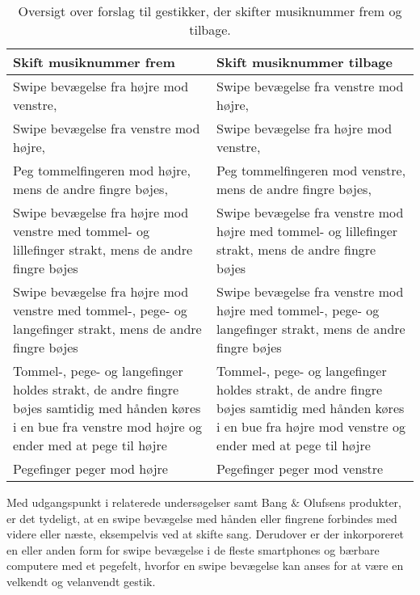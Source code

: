 \begin{table}[H]
	\centering
	\begin{tabular}{| p{6cm} | p{6cm} |}
		\hline
		\textbf{Skift musiknummer frem} & \textbf{Skift musiknummer tilbage} \\ \hline
		Swipe bevægelse fra højre mod venstre, \parencite[s. 48]{WEB:Beosound2, WEB:BeosoundMoment, PDF:UserDefinedGesturesTV} & Swipe bevægelse fra venstre mod højre, \parencite[s. 48]{WEB:Beosound2, WEB:BeosoundMoment, PDF:UserDefinedGesturesTV} \\ \hline
		Swipe bevægelse fra venstre mod højre, \parencite[s. 166]{PDF:ComparingInputModalities}  & Swipe bevægelse fra højre mod venstre, \parencite[s. 166]{PDF:ComparingInputModalities}  \\ \hline
		Peg tommelfingeren mod højre, mens de andre fingre bøjes, \parencite[s. 166]{PDF:ComparingInputModalities} & Peg tommelfingeren mod venstre, mens de andre fingre bøjes, \parencite[s. 166]{PDF:ComparingInputModalities} \\ \hline
		Swipe bevægelse fra højre mod venstre med tommel- og lillefinger strakt, mens de andre fingre bøjes & Swipe bevægelse fra venstre mod højre med tommel- og lillefinger strakt, mens de andre fingre bøjes \\ \hline
		Swipe bevægelse fra højre mod venstre med tommel-, pege- og langefinger strakt, mens de andre fingre bøjes & Swipe bevægelse fra venstre mod højre med tommel-, pege- og langefinger strakt, mens de andre fingre bøjes \\ \hline
		Tommel-, pege- og langefinger holdes strakt, de andre fingre bøjes samtidig med hånden køres i en bue fra venstre mod højre og ender med at pege til højre & Tommel-, pege- og langefinger holdes strakt, de andre fingre bøjes samtidig med hånden køres i en bue fra højre mod venstre og ender med at pege til højre\\ \hline
		Pegefinger peger mod højre & Pegefinger peger mod venstre\\ \hline
	\end{tabular}
	\caption{Oversigt over forslag til gestikker, der skifter musiknummer frem og tilbage.}
	\label{tab:IndsamledeGestikkerSkift}
\end{table}
\noindent
%
Med udgangspunkt i relaterede undersøgelser samt Bang $\&$ Olufsens produkter, er det tydeligt, at en swipe bevægelse med hånden eller fingrene forbindes med videre eller næste, eksempelvis ved at skifte sang. Derudover er der inkorporeret en eller anden form for swipe bevægelse i de fleste smartphones og bærbare computere med et pegefelt, hvorfor en swipe bevægelse kan anses for at være en velkendt og velanvendt gestik.


